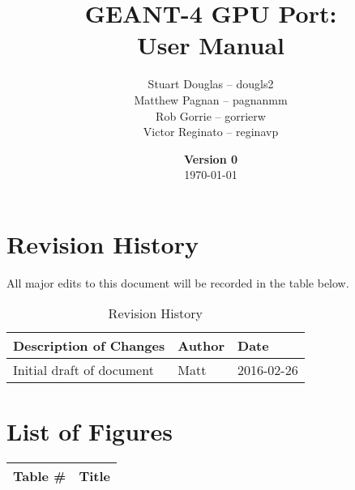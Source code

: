 \documentclass[12pt]{article}
\title{
\LARGE GEANT-4 GPU Port:
\\\vspace{10mm}
\large \textbf{User Manual}
\vspace{40mm}
}
\author{
Stuart Douglas -- dougls2
\\Matthew Pagnan -- pagnanmm
\\Rob Gorrie -- gorrierw
\\Victor Reginato -- reginavp
\vspace{10mm}
}
\date{\vfill \textbf{Version 0}\\ \today}
\begin{document}

\maketitle
\newpage

\tableofcontents
\newpage
{}
\restoregeometry

\section{Revision History}
All major edits to this document will be recorded in the table below.

\begin{table}[h]
\centering
\caption{Revision History}\label{Table_Revision}
\begin{tabular}{lll}
\toprule
\bf Description of Changes & \bf Author & \bf Date\\\midrule
Initial draft of document & Matt & 2016-02-26\\
\bottomrule
\end{tabular}
\end{table}

\section{List of Figures}
\begin{center}
\begin{tabular}{cl}
\toprule
\bf Table \# & \bf Title\\\midrule
\bottomrule
\end{tabular}
\end{center}
\end{document}
